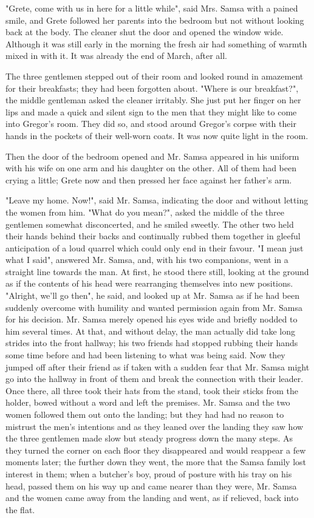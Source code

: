 "Grete, come with us in here for a little while", said Mrs. Samsa with a pained smile, and Grete followed her parents into the bedroom but not without looking back at the body. The cleaner shut the door and opened the window wide. Although it was still early in the morning the fresh air had something of warmth mixed in with it. It was already the end of March, after all.

The three gentlemen stepped out of their room and looked round in amazement for their breakfasts; they had been forgotten about. "Where is our breakfast?", the middle gentleman asked the cleaner irritably. She just put her finger on her lips and made a quick and silent sign to the men that they might like to come into Gregor's room. They did so, and stood around Gregor's corpse with their hands in the pockets of their well-worn coats. It was now quite light in the room.

Then the door of the bedroom opened and Mr. Samsa appeared in his uniform with his wife on one arm and his daughter on the other. All of them had been crying a little; Grete now and then pressed her face against her father's arm.

"Leave my home. Now!", said Mr. Samsa, indicating the door and without letting the women from him. "What do you mean?", asked the middle of the three gentlemen somewhat disconcerted, and he smiled sweetly. The other two held their hands behind their backs and continually rubbed them together in gleeful anticipation of a loud quarrel which could only end in their favour. "I mean just what I said", answered Mr. Samsa, and, with his two companions, went in a straight line towards the man. At first, he stood there still, looking at the ground as if the contents of his head were rearranging themselves into new positions. "Alright, we'll go then", he said, and looked up at Mr. Samsa as if he had been suddenly overcome with humility and wanted permission again from Mr. Samsa for his decision. Mr. Samsa merely opened his eyes wide and briefly nodded to him several times. At that, and without delay, the man actually did take long strides into the front hallway; his two friends had stopped rubbing their hands some time before and had been listening to what was being said. Now they jumped off after their friend as if taken with a sudden fear that Mr. Samsa might go into the hallway in front of them and break the connection with their leader. Once there, all three took their hats from the stand, took their sticks from the holder, bowed without a word and left the premises. Mr. Samsa and the two women followed them out onto the landing; but they had had no reason to mistrust the men's intentions and as they leaned over the landing they saw how the three gentlemen made slow but steady progress down the many steps. As they turned the corner on each floor they disappeared and would reappear a few moments later; the further down they went, the more that the Samsa family lost interest in them; when a butcher's boy, proud of posture with his tray on his head, passed them on his way up and came nearer than they were, Mr. Samsa and the women came away from the landing and went, as if relieved, back into the flat.

